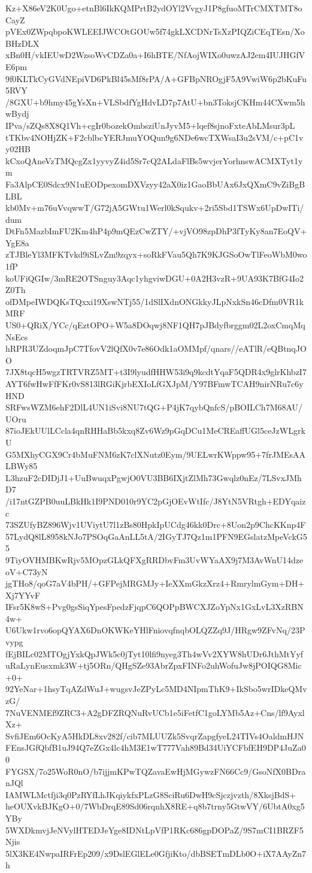 Kz+X86eV2K0Ugo+etnBl6IkKQMPrtB2ydOYl2VvgyJ1P8gfuoMTrCMXTMT8oCayZ
pVEx0ZWpqbpoKWLEEIJWCOtGOUw5f74gkLXCDNrTsXzPIQZiCEqTEsn/XoBHzDLX
xBn0H/vkIEUwD2WzsoWvCDZa0a+I6hBTE/NfAojWIXo0uwzAJ2em4IUJHGfVE6pm
9f0KLTkCyGVdNEpiVD6PkBl45sMf8rPA/A+GFBpNROgjF5A9VwiW6p2bKuFu5RVY
/8GXU+b9hmy45gYsXn+VLSbdfYgHdvLD7p7AtU+bn3ToksjCKHm44CXwm5hwBydj
IPva/sZQs8X8Q1Vh+cgIr0bozekOmbsziUnJyvM5+lqef8sjnoFxteAbLMsur3pL
tTKbv4NOHjZK+F2cblbcYERJmuYOQun9g6NDe6wcTXWsaI3u2sVM/c+pC1vy02HB
kCxoQAneVzTMQcgZx1yyvyZ4id5Sr7cQ2ALdaFlBs5wvjerYorhnswACMXTyt1ym
Fa3AlpCE0Sdcx9N1uEODpexomDXVzyy42aX0iz1GaoBbUAx6JxQXmC9vZiBgBLBL
kb0Mv+m76uVvqwwT/G72jA5GWtu1Werl0kSqukv+2ri5Sbd1TSWx6UpDwITi/dum
DtFn5MazbImFU2Km4hP4p9mQEzCwZTY/+vjVO98zpDhP3fTyKy8an7EoQV+YgE8a
zTJBleYl3MFKTvkd9iSLvZm9zqyx+soRkFVau5Qh7K9KJGSoOwTlFeoWbM0wo1fP
koUFiQGIw/3mRE2OTSnguy3Aqc1yhgviwDGU+0A2H3vzR+9UA93K7BfG4Io2Z0Th
ofDMpeIWDQKsTQxxi19XswNTj55/1dSlIXdnONGkkyJLpNxkSn46cDfm0VR1kMRF
US0+QRiX/YCc/qEztOPO+W5a8DOqwj8NF1QH7pJBdyfbrggm02L2oxCmqMqNsEcs
hRPR3UZdoqmJpC7TfovV2lQfX0v7e86Odk1aOMMpf/qnars//eATlR/eQBtnqJOO
7JX8tqcH5wgzTRTVRZ5MT+t3I9lyudfHHW53i9q9kcdtYqaF5QDR4x9glrKhbzI7
AYT6fwHwFfFKr0vS813lRGiKjrbEXIoLfGXJpM/Y97BFmwTCAH9nirNRu7c6yHND
SRFwsWZM6ehF2DlL4UN1iSvi8NU7tQG+P4jK7qybQnfcS/pBOILCh7M68AU/UOru
87ioJEkUUlLCcla4qnRHHaBb5kxq8Zv6Wz9pGqDCu1MeCREaffUGl5ceJzWLgrkU
G5MXhyCGX9Cr4bMuFNM6zK7clXNutz0Eym/9UELwrKWppw95+7frJMEsAALBWy85
L3hzuF2cDIDjJ1+UuBwuqxPgwjO0VU3BB6IXjtZlMh73Gwqlz0nEz/7LSvxJMhD7
/i17ntGZPB0uuLBkHk1I9PND010r9YC2pGjOEvWtIfc/J8YtN5VRtgh+EDYqaizc
73SZUfyBZ896Wjv1UViytU7l1zBs80HpkIpUCdg46kk0Drc+8Uon2p9ChcKKnp4F
57LydQ8lL8958kNJo7PSOqGaAnLL5tA/2IGyTJ7Qz1m1PFN9EGslatzMpeVckG55
9TiyOVHMBKwRjv5MOpzGLkQFXgRRDbvFm3UvWYaAX9j7M3AvWnU14dzeoV+C73yN
jgTHo8/qoG7aV4bPH/+GFPejMRGMJy+IeXXmGkzXrz4+RmrylmGym+DH+Xj7YYvF
IFsr5K8wS+Pvg0gsSiqYpesFpedzFjqpC6QOPpBWCXJZoYpNx1GxLvL3XzRBN4w+
U6Ukw1rvo6opQYAX6DnOKWKeYHlFniovqfnqbOLQZZq9J/HRgw9ZFvNq/23Pvypg
fEjBILc02MTOgjYxkQpJWk5c0jTyt10lfi9nyeg3Th4wVv2XYW8hUDr6JthMtYyf
uRaLynEusxmk3W+tj5ORn/QHgSZe93AbrZpxFINFo2uhWofuJw8jPOIQG8Mic+0+
92YeNar+1hsyTqAZdWuJ+wugsvJeZPyLc5MD4NIpmThK9+IkSbo5wrIDkeQMvzG/
7NuVENMEf9ZRC3+A2gDFZRQNuRvUCb1e5iFetfC1goLYMb5Az+Cns/lf9AyxlXz+
SvfiJEm6OcKyA5HkDL8xv282f/cib7MLUUZk5SvqrZapgfyeL24TIVs4OaldmHJN
FEnsJGfQbfB1uJ94Q7eZGx4lc4hM3E1wT777Vah89Bd34UiYCFbfEH9DP4JuZa00
FYGSX/7o25WoR0nO/b7ijjmKPwTQZavaEwHjMGywzFN66Cc9/GsoNfX0BDranJQl
IAMWLMctfji3q0PzRYfLhJKqiykfxPLzG8SciRu6DwH9cSjczjvzth/8XksjBdS+
heOUXvkBJKgO+0/7WbDrqE89Sd06rqnhX8RE+q8b7trny5GtwVY/6UbtA0xg5YBy
5WXDkmvjJeNVylHTEDJeYge8IDNtLpVfP1RKc686gpDOPaZ/9S7mCI1BRZF5Njis
5lX3KE4NwpaIRFrEp209/x9DslEGlELe0GfjiKto/dbBSETmDLb0O+iX7AAyZn7h
